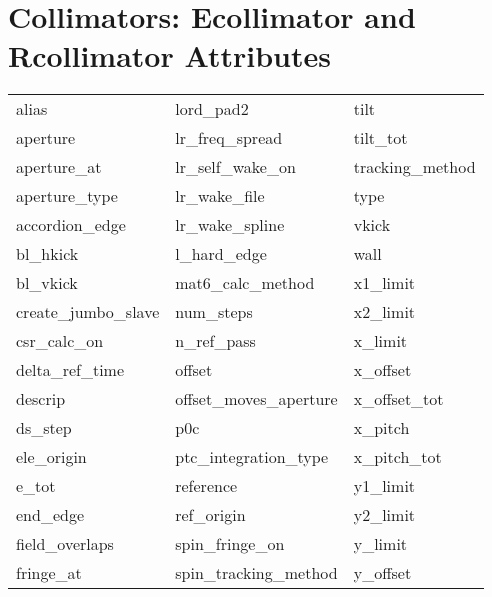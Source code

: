  \section{Collimators: Ecollimator and Rcollimator Attributes}
 \label{s:list.collimator}
 
 \begin{tabular}{lll} \toprule
alias                       & lord_pad2                   & tilt                        \\
aperture                    & lr_freq_spread              & tilt_tot                    \\
aperture_at                 & lr_self_wake_on             & tracking_method             \\
aperture_type               & lr_wake_file                & type                        \\
accordion_edge              & lr_wake_spline              & vkick                       \\
bl_hkick                    & l_hard_edge                 & wall                        \\
bl_vkick                    & mat6_calc_method            & x1_limit                    \\
create_jumbo_slave          & num_steps                   & x2_limit                    \\
csr_calc_on                 & n_ref_pass                  & x_limit                     \\
delta_ref_time              & offset                      & x_offset                    \\
descrip                     & offset_moves_aperture       & x_offset_tot                \\
ds_step                     & p0c                         & x_pitch                     \\
ele_origin                  & ptc_integration_type        & x_pitch_tot                 \\
e_tot                       & reference                   & y1_limit                    \\
end_edge                    & ref_origin                  & y2_limit                    \\
field_overlaps              & spin_fringe_on              & y_limit                     \\
fringe_at                   & spin_tracking_method        & y_offset                    \\

\end{tabular}
